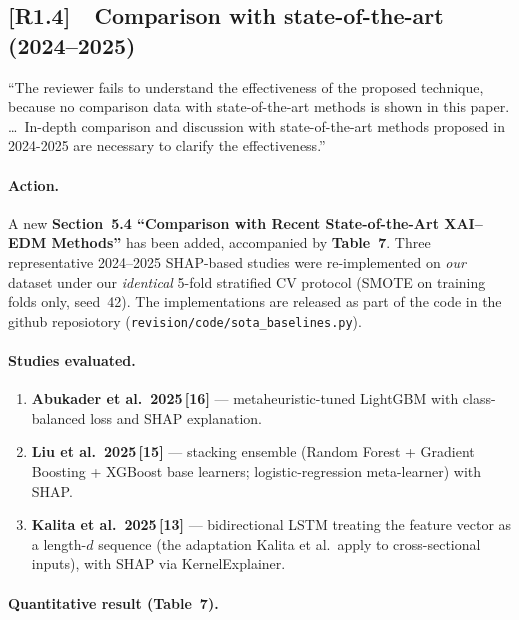 \documentclass[11pt,a4paper]{article}
\newcommand{\cid}[1]{\textcolor{revred}{\textbf{[#1]}}}
\newcommand{\filebox}[1]{\texttt{\small #1}}
\newcommand{\sectref}[1]{Section~#1}
\newcommand{\stress}[1]{\textbf{#1}}
\begin{document}
\subsection*{\cid{R1.4}~~Comparison with state-of-the-art (2024--2025)}

\begin{reviewerquote}
``The reviewer fails to understand the effectiveness of the proposed technique, because no comparison data with state-of-the-art methods is shown in this paper. \ldots\ In-depth comparison and discussion with state-of-the-art methods proposed in 2024-2025 are necessary to clarify the effectiveness.''
\end{reviewerquote}

\paragraph{Action.} A new \stress{\sectref{5.4} ``Comparison with Recent State-of-the-Art XAI--EDM Methods''} has been added, accompanied by \stress{Table~7}. Three representative 2024--2025 SHAP-based studies were re-implemented on \emph{our} dataset under our \emph{identical} 5-fold stratified CV protocol (SMOTE on training folds only, seed~42). The implementations are released as part of the code in the github reposiotory (\filebox{revision/code/sota\_baselines.py}).

\paragraph{Studies evaluated.}
\begin{enumerate}
  \item \stress{Abukader et al.\ 2025\,[16]} --- metaheuristic-tuned LightGBM with class-balanced loss and SHAP explanation.
  \item \stress{Liu et al.\ 2025\,[15]} --- stacking ensemble (Random Forest + Gradient Boosting + XGBoost base learners; logistic-regression meta-learner) with SHAP.
  \item \stress{Kalita et al.\ 2025\,[13]} --- bidirectional LSTM treating the feature vector as a length-$d$ sequence (the adaptation Kalita et al.\ apply to cross-sectional inputs), with SHAP via KernelExplainer.
\end{enumerate}

\paragraph{Quantitative result (Table~7).}
\end{document}
